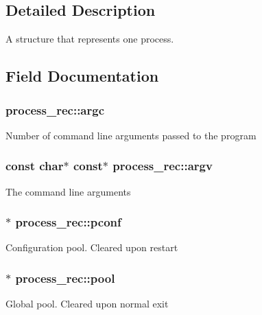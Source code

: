 \subsection{Detailed Description}
A structure that represents one process. 

\subsection{Field Documentation}
\subsubsection[{\texorpdfstring{argc}{argc}}]{ process\+\_\+rec\+::argc}\hypertarget{structprocess__rec_a0f2f21950cfa1b7ee6c7ddce4aa378f0}{}\label{structprocess__rec_a0f2f21950cfa1b7ee6c7ddce4aa378f0}
Number of command line arguments passed to the program 
\subsubsection[{\texorpdfstring{argv}{argv}}]{\setlength{\rightskip}{0pt plus 5cm}const char$\ast$ const$\ast$ process\+\_\+rec\+::argv}\hypertarget{structprocess__rec_ac33b09935915f820f21f3f8a5a610519}{}\label{structprocess__rec_ac33b09935915f820f21f3f8a5a610519}
The command line arguments 
\subsubsection[{\texorpdfstring{pconf}{pconf}}]{$\ast$ process\+\_\+rec\+::pconf}\hypertarget{structprocess__rec_abd45db97ba3bd047eafc3bca08873e62}{}\label{structprocess__rec_abd45db97ba3bd047eafc3bca08873e62}
Configuration pool. Cleared upon restart 
\subsubsection[{\texorpdfstring{pool}{pool}}]{$\ast$ process\+\_\+rec\+::pool}\hypertarget{structprocess__rec_a10adc2d7a7a46a5285e6033cad375f24}{}\label{structprocess__rec_a10adc2d7a7a46a5285e6033cad375f24}
Global pool. Cleared upon normal exit 
